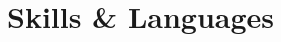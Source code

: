 \documentclass[10pt]{article}
\begin{document}
\section{Skills \& Languages}
\vspace{-1em}
\begin{multicols}{4}
\raggedcolumns
\begin{itemize}
\renewcommand{\labelitemi}{}
\renewcommand{\skill}{\textnormal}
\setlength{\itemsep}{1pt}
\setlength{\parskip}{0pt}
\setlength{\parsep}{0pt}

\SkillEntry{\LaTeX}{\twoskill}
\end{itemize}
\end{multicols}\vspace{-1em}






\end{document}
